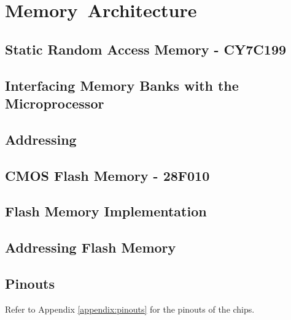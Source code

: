 \section{Memory Architecture}

    \subsection{Static Random Access Memory - CY7C199}

    \subsection{Interfacing Memory Banks with the Microprocessor}

    \subsection{Addressing}

    \subsection{CMOS Flash Memory - 28F010}

    \subsection{Flash Memory Implementation}

    \subsection{Addressing Flash Memory}

    \subsection{Pinouts}
    Refer to Appendix \ref{appendix:pinouts} for the pinouts of the chips.
